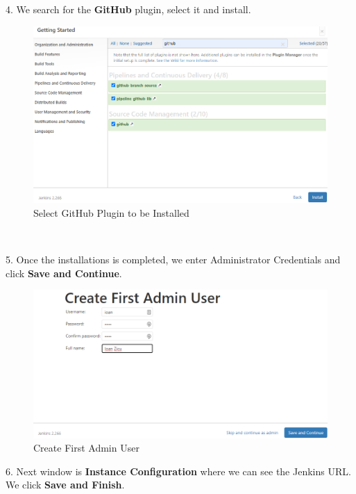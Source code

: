 \documentclass[12pt,a4paper,twoside]{article}
\begin{document}
4. We search for the \textbf{GitHub} plugin, select it and install.


\begin{figure}[H]
    \centering
        \includegraphics[width=15cm]{images-aws/23-jenkins-select-github-plugin.png}
        \caption{Select GitHub Plugin to be Installed}
\end{figure}


~\newline


5. Once the installations is completed, we enter Administrator Credentials and click \textbf{Save and Continue}.


\begin{figure}[H]
    \centering
        \includegraphics[width=15cm]{images-aws/24-jenkins-admin-user.png}
        \caption{Create First Admin User}
\end{figure}


6. Next window is \textbf{Instance Configuration} where we can see the Jenkins URL. We click \textbf{Save and Finish}.
\end{document}
